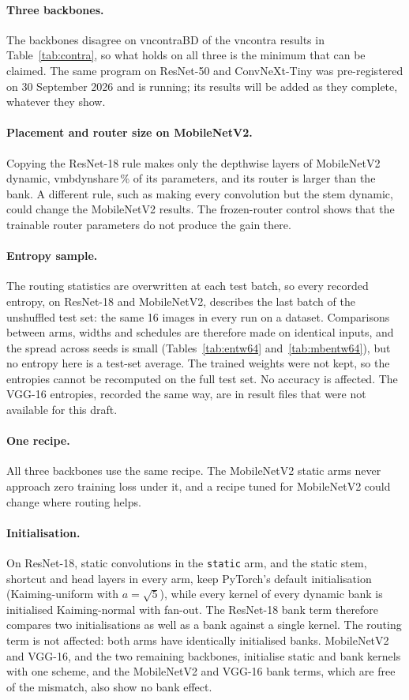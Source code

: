 \documentclass[10pt,a4paper]{article}
\newcommand{\V}[1]{\csname v#1\endcsname}
\begin{document}
\paragraph{Three backbones.} The backbones disagree on \V{ncontraBD} of the
\V{ncontra} results in Table~\ref{tab:contra}, so what holds on all three
is the minimum that can be claimed. The same program on ResNet-50 and
ConvNeXt-Tiny was pre-registered on 30 September 2026 and is running; its
results will be added as they complete, whatever they show.

\paragraph{Placement and router size on MobileNetV2.} Copying the
ResNet-18 rule makes only the depthwise layers of MobileNetV2 dynamic,
\V{mbdynshare}\,\% of its parameters, and its router is larger than the
bank. A different rule, such as making every convolution but the stem
dynamic, could change the MobileNetV2 results. The frozen-router control
shows that the trainable router parameters do not produce the gain there.

\paragraph{Entropy sample.} The routing statistics are overwritten at each
test batch, so every recorded entropy, on ResNet-18 and MobileNetV2,
describes the last batch of the unshuffled test set: the same 16 images in
every run on a dataset. Comparisons between arms, widths and schedules are
therefore made on identical inputs, and the spread across seeds is small
(Tables~\ref{tab:entw64} and~\ref{tab:mbentw64}), but no entropy here is a
test-set average. The trained weights were not kept, so the entropies
cannot be recomputed on the full test set. No accuracy is affected. The
VGG-16 entropies, recorded the same way, are in result files that were not
available for this draft.

\paragraph{One recipe.} All three backbones use the same recipe. The
MobileNetV2 static arms never approach zero training loss under it, and a
recipe tuned for MobileNetV2 could change where routing helps.

\paragraph{Initialisation.} On ResNet-18, static convolutions in the
\texttt{static} arm, and the static stem, shortcut and head layers in
every arm, keep PyTorch's default initialisation (Kaiming-uniform with
$a=\sqrt5$), while every kernel of every dynamic bank is initialised
Kaiming-normal with fan-out. The ResNet-18 bank term therefore compares
two initialisations as well as a bank against a single kernel. The routing
term is not affected: both arms have identically initialised banks.
MobileNetV2 and VGG-16, and the two remaining backbones, initialise static
and bank kernels with one scheme, and the MobileNetV2 and VGG-16 bank
terms, which are free of the mismatch, also show no bank effect.
\end{document}
